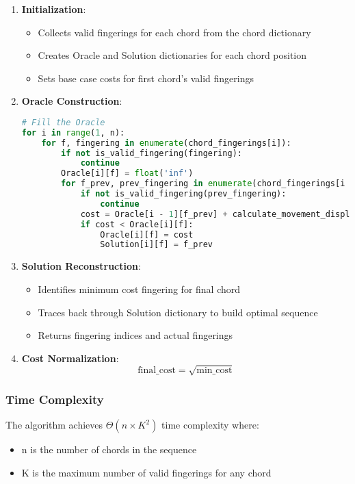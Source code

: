 \documentclass[conference]{IEEEtran}
\begin{document}
\begin{enumerate}
\item \textbf{Initialization}:
\begin{itemize}
    \item Collects valid fingerings for each chord from the chord dictionary
    \item Creates Oracle and Solution dictionaries for each chord position
    \item Sets base case costs for first chord's valid fingerings
\end{itemize}

\item \textbf{Oracle Construction}:
\begin{lstlisting}[language=Python]
# Fill the Oracle
for i in range(1, n):
    for f, fingering in enumerate(chord_fingerings[i]):
        if not is_valid_fingering(fingering):
            continue
        Oracle[i][f] = float('inf')
        for f_prev, prev_fingering in enumerate(chord_fingerings[i - 1]):
            if not is_valid_fingering(prev_fingering):
                continue
            cost = Oracle[i - 1][f_prev] + calculate_movement_displacement(prev_fingering, fingering)
            if cost < Oracle[i][f]:
                Oracle[i][f] = cost
                Solution[i][f] = f_prev
\end{lstlisting}

\item \textbf{Solution Reconstruction}:
\begin{itemize}
    \item Identifies minimum cost fingering for final chord
    \item Traces back through Solution dictionary to build optimal sequence
    \item Returns fingering indices and actual fingerings
\end{itemize}

\item \textbf{Cost Normalization}:
\[ \text{final\_cost} = \sqrt{\text{min\_cost}} \]
\end{enumerate}

\subsubsection{Time Complexity}
The algorithm achieves \(\Theta(n \times K^2)\) time complexity where:
\begin{itemize}
    \item n is the number of chords in the sequence
    \item K is the maximum number of valid fingerings for any chord
\end{itemize}
\end{document}

